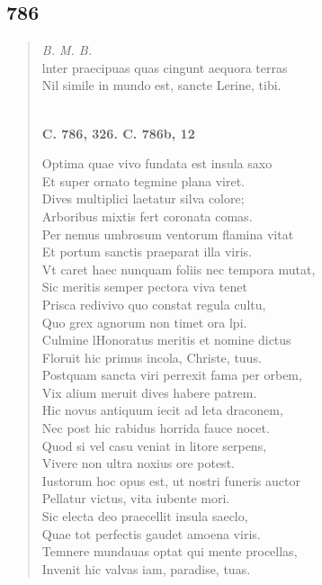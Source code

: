 \documentclass[11pt, a4paper]{report}
\begin{document}
            \subsection*{786}
      \begin{verse}
      \textit{B. M. B.} \\ lnter praecipuas quas cingunt aequora terras \\ Nil simile in mundo est, sancte Lerine, tibi. \\ 
        ﻿\pagebreak 
    \begin{center} \textbf{C. 786, 326. C. 786b, 12} \end{center} \marginpar{[266]} Optima quae vivo fundata est insula saxo \\ Et super ornato tegmine plana viret. \\ Dives multiplici laetatur silva colore; \\ Arboribus mixtis fert coronata comas. \\ Per nemus umbrosum ventorum flamina vitat \\ Et portum sanctis praeparat illa viris. \\ Vt caret haec nunquam foliis nec tempora mutat, \\ Sic meritis semper pectora  \lbrack viva \rbrack  tenet \\ Prisca redivivo quo constat regula cultu, \\ Quo grex agnorum non timet ora lpi. \\ Culmine lHonoratus meritis et nomine dictus \\ Floruit hic primus incola, Christe, tuus. \\ Postquam sancta viri perrexit fama per orbem, \\ Vix  \lbrack alium \rbrack  meruit dives habere patrem. \\ Hic novus antiquum iecit ad leta draconem, \\ Nec post hic rabidus horrida fauce nocet. \\ Quod si vel casu veniat in litore serpens, \\ Vivere non ultra noxius ore potest. \\ Iustorum hoc opus est, ut nostri funeris auctor \\ Pellatur victus, vita iubente mori. \\ Sic electa deo praecellit insula saeclo, \\ Quae tot perfectis gaudet amoena viris. \\ Temnere mundauas optat qui mente procellas, \\ Invenit hic valvas iam, paradise, tuas. \\ 
      \end{verse}
  
\end{document}
